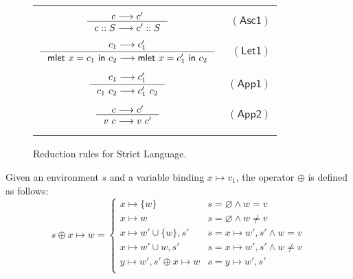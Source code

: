 \documentclass[preprint,authoryear,sort&compress,9pt,nocopyrightspace]{article}
\newcommand\rulename[1]{\mathsf{(#1)}}
\newcommand{\tto}{\longrightarrow}
\newcommand{\ascrip}[1]{#1::T}
\newcommand{\ascripS}[1]{#1::S}
\newcommand{\oletP}[3]{\mathsf{mlet} \ x = #2 \ \mathsf{in}  \ #3}
\newcommand{\negacion}[1]{\mathsf{not} \ #1}
\newcommand{\suma}[1]{\mathsf{add1} \ #1}
\newcommand{\semanticC}{Strict Language}
\begin{document}
\begin{figure}[]
\begin{small}
\begin{center}
\begin{tabular}{|c r|}
&\\
$ \inference {c \tto c'}{\ascripS{c} \tto \ascripS{c'} }$&$\rulename{Asc1} $\\
 &\\
$ \inference {c_1 \tto c_1'}{\oletP{T_1}{c_1}{c_2} \tto \oletP{T_1}{c_1'}{c_2} }$&$\rulename{Let1} $\\
&\\
$\inference {c_1 \tto c_1'}{c_1 \ c_2 \tto c_1' \ c_2} $&$\rulename{App1}  $\\
&\\
$ \inference {c \tto c'}{v \ c \tto v \ c'}$&$\rulename{App2}  $\\
&\\
&\\
\hline
\end{tabular}
\caption{Reduction rules for \semanticC.}
\label{tabla:sencilla}
\end{center}
\end{small}
\end{figure}


\begin{definition}[$\oplus$]
\label{definition:tcs}
\mbox{}
Given an environment  $s$ and a variable binding $x \mapsto v_1$, the operator $\oplus$ is defined  as follows:
\[ s \oplus x \mapsto w = \begin{cases} 
      x \mapsto \{w\}& s =  \varnothing \wedge w = v\\
      x \mapsto w & s =  \varnothing \wedge w \neq v\\
      x \mapsto w' \cup \{w\}, s' & s = x \mapsto w', s' \wedge w = v\\
      x \mapsto w' \cup w, s' & s = x \mapsto w', s' \wedge w \neq v\\
      y \mapsto w', s' \oplus x \mapsto w & s = y \mapsto w', s'\\
   \end{cases}
\]
\end{definition}
\end{document}
